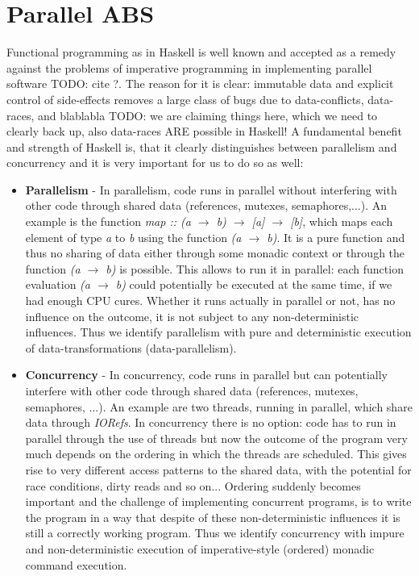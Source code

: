 \chapter*{Parallel ABS}
\label{ch:parallel_abs}
Functional programming as in Haskell is well known and accepted as a remedy against the problems of imperative programming in implementing parallel software TODO: cite ?. The reason for it is clear: immutable data and explicit control of side-effects removes a large class of bugs due to data-conflicts, data-races, and blablabla TODO: we are claiming things here, which we need to clearly back up, also data-races ARE possible in Haskell! A fundamental benefit and strength of Haskell is, that it clearly distinguishes between parallelism and concurrency \cite{jones_tackling_2002} and it is very important for us to do so as well:

\begin{itemize}
	\item \textbf{Parallelism} - In parallelism, code runs in parallel without interfering with other code through shared data (references, mutexes, semaphores,...). An example is the function \textit{map :: (a $\rightarrow$ b) $\rightarrow$ [a] $\rightarrow$ [b]}, which maps each element of type \textit{a} to \textit{b} using the function \textit{(a $\rightarrow$ b)}. It is a pure function and thus no sharing of data either through some monadic context or through the function \textit{(a $\rightarrow$ b)} is possible. This allows to run it in parallel: each function evaluation \textit{(a $\rightarrow$ b)} could potentially be executed at the same time, if we had enough CPU cures. Whether it runs actually in parallel or not, has no influence on the outcome, it is not subject to any non-deterministic influences. Thus we identify parallelism with pure and deterministic execution of data-transformations (data-parallelism).
	
	\item \textbf{Concurrency} - In concurrency, code runs in parallel but can potentially interfere with other code through shared data (references, mutexes, semaphores, ...). An example are two threads, running in parallel, which share data through \textit{IORefs}. In concurrency there is no option: code has to run in parallel through the use of threads but now the outcome of the program very much depends on the ordering in which the threads are scheduled. This gives rise to very different access patterns to the shared data, with the potential for race conditions, dirty reads and so on... Ordering suddenly becomes important and the challenge of implementing concurrent programs, is to write the program in a way that despite of these non-deterministic influences it is still a correctly working program. Thus we identify concurrency with impure and non-deterministic execution of imperative-style (ordered) monadic command execution.
\end{itemize}

